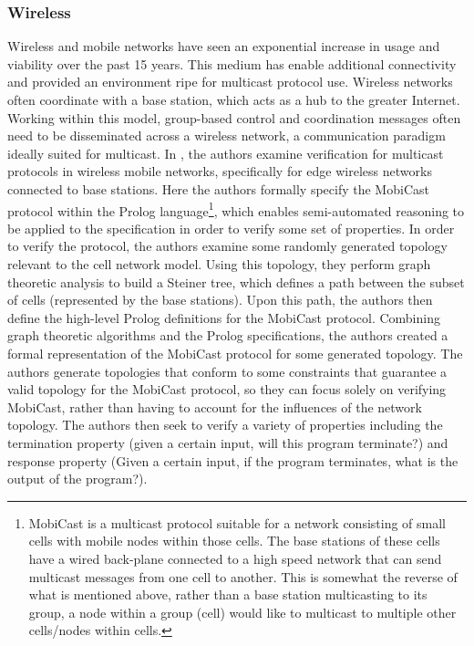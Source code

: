 \documentclass[11pt, journal]{IEEEtran}
\begin{document}
\subsubsection{Wireless}
Wireless and mobile networks have seen an exponential increase in usage and viability over the past 15 years. This medium has enable additional connectivity and provided an environment ripe for multicast protocol use. Wireless networks often coordinate with a base station, which acts as a hub to the greater Internet. Working within this model, group-based control and coordination messages often need to be disseminated across a wireless network, a communication paradigm ideally suited for multicast.
\bigbreak
In \cite{Borujerdi2004}, the authors examine verification for multicast protocols in wireless mobile networks, specifically for edge wireless networks connected to base stations. Here the authors formally specify the MobiCast protocol\cite{Tan2000} within the Prolog language\footnote{MobiCast is a multicast protocol suitable for a network consisting of small cells with mobile nodes within those cells. The base stations of these cells have a wired back-plane connected to a high speed network that can send multicast messages from one cell to another. This is somewhat the reverse of what is mentioned above, rather than a base station multicasting to its group, a node within a group (cell) would like to multicast to multiple other cells/nodes within cells.}, which enables semi-automated reasoning to be applied to the specification in order to verify some set of properties.
\bigbreak
In order to verify the protocol, the authors examine some randomly generated topology relevant to the cell network model. Using this topology, they perform graph theoretic analysis to build a Steiner tree, which defines a path between the subset of cells (represented by the base stations). Upon this path, the authors then define the high-level Prolog definitions for the MobiCast protocol. 
\bigbreak
Combining graph theoretic algorithms and the Prolog specifications, the authors created a formal representation of the MobiCast protocol for some generated topology. The authors generate topologies that conform to some constraints that guarantee a valid topology for the MobiCast protocol, so they can focus solely on verifying MobiCast, rather than having to account for the influences of the network topology. The authors then seek to verify a variety of properties including the termination property (given a certain input, will this program terminate?) and response property (Given a certain input, if the program terminates, what is the output of the program?).
\end{document}
